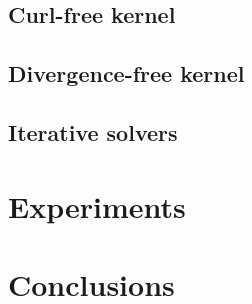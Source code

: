 \subsection{Curl-free kernel}
\subsection{Divergence-free kernel}

\subsection{Iterative solvers}

\section{Experiments}

\clearpage
\section{Conclusions}
\label{sec:conclusions}

\chapterend
